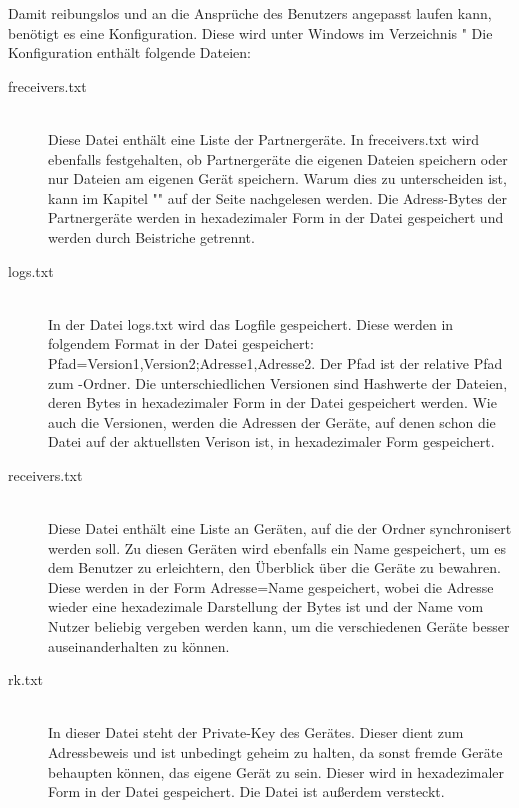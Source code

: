 Damit \sblit reibungslos und an die Ansprüche des Benutzers angepasst laufen kann, benötigt es eine Konfiguration. Diese wird unter Windows im Verzeichnis "%
Die Konfiguration enthält folgende Dateien:
\begin{description}
	\item[{freceivers.txt}]\label{freceivers}  \hfill \\
	Diese Datei enthält eine Liste der Partnergeräte. In freceivers.txt wird ebenfalls festgehalten, ob Partnergeräte die eigenen Dateien speichern oder nur Dateien am eigenen Gerät speichern. Warum dies zu unterscheiden ist, kann im Kapitel "" auf der Seite \pageref{Partnerschaften} nachgelesen werden. Die Adress-Bytes der Partnergeräte werden in hexadezimaler Form in der Datei gespeichert und werden durch Beistriche getrennt.
	\item[{logs.txt}] \hfill \\
	In der Datei logs.txt wird das Logfile  gespeichert. Diese werden in folgendem Format in der Datei gespeichert: Pfad=Version1,Version2;Adresse1,Adresse2. Der Pfad ist der relative Pfad zum \sblit-Ordner. Die unterschiedlichen Versionen sind Hashwerte der Dateien, deren Bytes in hexadezimaler Form in der Datei gespeichert werden. Wie auch die Versionen, werden die Adressen der Geräte, auf denen schon die Datei auf der aktuellsten Verison ist, in hexadezimaler Form gespeichert.
	\item[{receivers.txt}] \hfill \\
	Diese Datei enthält eine Liste an Geräten, auf die der Ordner synchronisert werden soll. Zu diesen Geräten wird ebenfalls ein Name gespeichert, um es dem Benutzer zu erleichtern, den Überblick über die Geräte zu bewahren. Diese werden in der Form Adresse=Name gespeichert, wobei die Adresse wieder eine hexadezimale Darstellung der Bytes ist und der Name vom Nutzer beliebig vergeben werden kann, um die verschiedenen Geräte besser auseinanderhalten zu können.
	\item[{rk.txt}] \hfill \\
	In dieser Datei steht der Private-Key des Gerätes. Dieser dient zum Adressbeweis und ist unbedingt geheim zu halten, da sonst fremde Geräte behaupten können, das eigene Gerät zu sein. Dieser wird in hexadezimaler Form in der Datei gespeichert. Die Datei ist außerdem versteckt.

\end{description}
